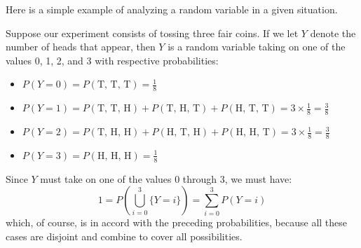 Here is a simple example of analyzing a random variable in a given situation.
\begin{example}
    Suppose our experiment consists of tossing three fair coins. If we let \( Y \) denote the number of heads that appear, then \( Y \) is a random variable taking on one of the values 0, 1, 2, and 3 with respective probabilities:

\begin{itemize}
    \item \( P(Y = 0) = P(\text{T, T, T}) = \frac{1}{8} \)
    \item \( P(Y = 1) = P(\text{T, T, H}) + P(\text{T, H, T}) + P(\text{H, T, T}) = 3 \times \frac{1}{8} = \frac{3}{8} \)
    \item \( P(Y = 2) = P(\text{T, H, H}) + P(\text{H, T, H}) + P(\text{H, H, T}) = 3 \times \frac{1}{8} = \frac{3}{8} \)
    \item \( P(Y = 3) = P(\text{H, H, H}) = \frac{1}{8} \)
\end{itemize}

Since \( Y \) must take on one of the values 0 through 3, we must have:
\[ 
1 = P\left( \bigcup_{i=0}^{3} \{Y = i\} \right) = \sum_{i=0}^{3} P(Y = i)
\]
which, of course, is in accord with the preceding probabilities, because all these
cases are disjoint and combine to cover all possibilities.
\end{example}

